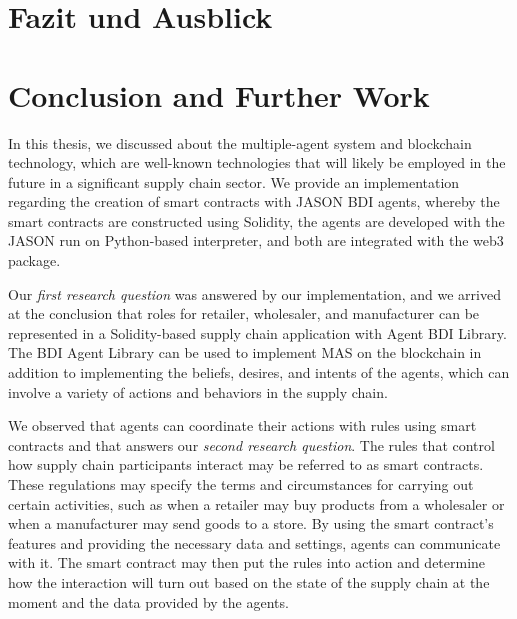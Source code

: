 {\chapter{Fazit und Ausblick}}
{\chapter{Conclusion and Further Work}}

\label{sec:conclusion}

In this thesis, we discussed about the multiple-agent system and blockchain technology, which are well-known technologies that will likely be employed in the future in a significant supply chain sector. We provide an implementation regarding the creation of smart contracts with JASON \ac{BDI} agents, whereby the smart contracts are constructed using Solidity, the agents are developed with the JASON run on Python-based interpreter, and both are integrated with the web3 package. 

\vspace{.5cm}

Our \textit{first research question} was answered by our implementation, and we arrived at the conclusion that roles for retailer, wholesaler, and manufacturer can be represented in a Solidity-based supply chain application with Agent \ac{BDI} Library. The \ac{BDI} Agent Library can be used to implement \ac{MAS} on the blockchain in addition to implementing the beliefs, desires, and intents of the agents, which can involve a variety of actions and behaviors in the supply chain.

\vspace{.5cm}

We observed that agents can coordinate their actions with rules using smart contracts and that answers our \textit{second research question}. The rules that control how supply chain participants interact may be referred to as smart contracts. These regulations may specify the terms and circumstances for carrying out certain activities, such as when a retailer may buy products from a wholesaler or when a manufacturer may send goods to a store. By using the smart contract's features and providing the necessary data and settings, agents can communicate with it. The smart contract may then put the rules into action and determine how the interaction will turn out based on the state of the supply chain at the moment and the data provided by the agents.

\vspace{.5cm}

